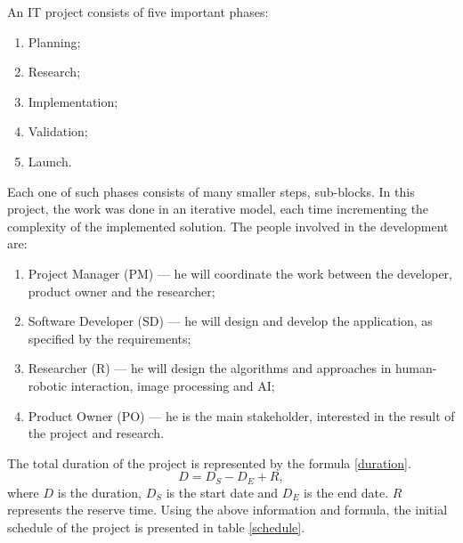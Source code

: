 		An IT project consists of five important phases:
        \begin{enumerate}[topsep=0pt, partopsep=0pt,itemsep=0pt,parsep=1pt, itemindent=1cm]
        \item Planning;
        \item Research;
        \item Implementation;
        \item Validation;
        \item Launch.
        \end{enumerate}
        Each one of such phases consists of many smaller steps, sub-blocks. In this project, the work was done in an iterative model, each time incrementing the complexity of the implemented solution.
    	The people involved in the development are:
    	\begin{enumerate}[topsep=0pt, partopsep=0pt,itemsep=0pt,parsep=1pt]
        \item Project Manager (PM) — he will coordinate the work between the developer, product owner and the researcher;
        \item Software Developer (SD) — he will design and develop the application, as specified by the requirements;
        \item Researcher (R) — he will design the algorithms and approaches in human-robotic interaction, image processing and AI;
        \item Product Owner (PO) — he is the main stakeholder, interested in the result of the project and research.
        \end{enumerate}
        The total duration of the project is represented by the formula \ref{duration}.
      \begin{equation}
      \label{duration}
      	D = D_{S} - D_{E} + R,
        \end{equation}
        where \( D\) is the duration, \( D_{S}\) is the start date and \(D_{E}\) is the end date. \(R\) represents the reserve time.
        Using the above information and formula, the initial schedule of the project is presented in table \ref{schedule}.

